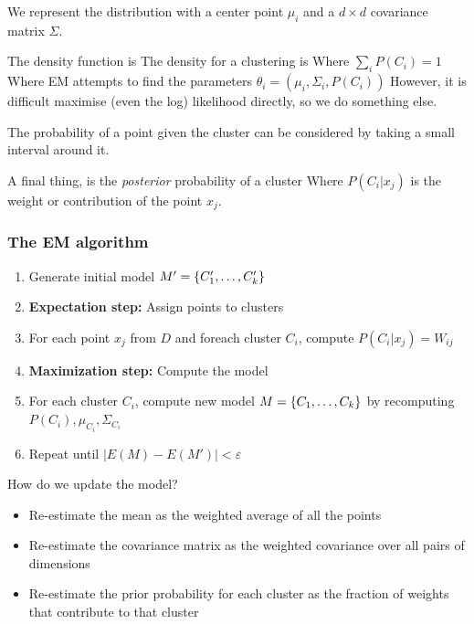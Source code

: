 We represent the distribution with a center point $\mu_i$ and a $d \times d$ covariance matrix $\Sigma$. 

The density function is
The density for a clustering is 
Where $\sum_{i}{P(C_i)} = 1$ \newline
Where EM attempts to find the parameters $\theta_i = (\mu_i, \Sigma_i, P(C_i))$
However, it is difficult maximise (even the log) likelihood directly, so we do something else. 

The probability of a point given the cluster can be considered by taking a small interval around it.

A final thing, is the \emph{posterior} probability of a cluster
Where $P(C_i | x_j)$ is the weight or contribution of the point $x_j$.

\subsubsection{The EM algorithm}
    \begin{enumerate}
        \item Generate initial model $M' = \{C_1', \dots, C_k'\}$
        \item \textbf{Expectation step:} Assign points to clusters
        \item For each point $x_j$ from $D$ and foreach cluster $C_i$, compute $P(C_i | x_j) = W_{ij}$
        \item \textbf{Maximization step:} Compute the model
        \item For each cluster $C_i$, compute new model $M = \{C_1, \dots, C_k\}$ by recomputing $P(C_i), \mu_{C_i}, \Sigma_{C_i}$
        \item Repeat until $|E(M) - E(M')| < \varepsilon$
    \end{enumerate}

How do we update the model? 
\begin{itemize}
    \item Re-estimate the mean as the weighted average of all the points
\item Re-estimate the covariance matrix as the weighted covariance over all pairs of dimensions 
\item Re-estimate the prior probability for each cluster as the fraction of weights that contribute to that cluster 
\end{itemize}


